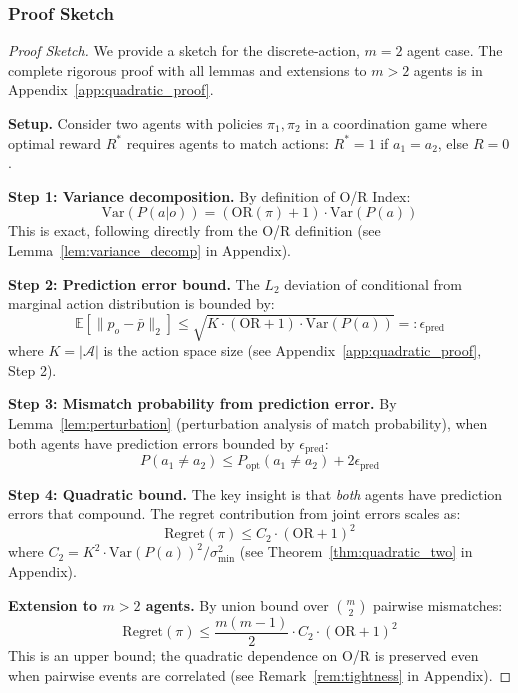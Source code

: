 \subsubsection{Proof Sketch}

\begin{proof}[Proof Sketch]
We provide a sketch for the discrete-action, $m=2$ agent case. The complete rigorous proof with all lemmas and extensions to $m > 2$ agents is in Appendix~\ref{app:quadratic_proof}.

\textbf{Setup.} Consider two agents with policies $\pi_1, \pi_2$ in a coordination game where optimal reward $R^*$ requires agents to match actions: $R^* = 1$ if $a_1 = a_2$, else $R = 0$.

\textbf{Step 1: Variance decomposition.}
By definition of O/R Index:
\begin{equation}
\text{Var}(P(a|o)) = (\text{OR}(\pi) + 1) \cdot \text{Var}(P(a))
\end{equation}
This is exact, following directly from the O/R definition (see Lemma~\ref{lem:variance_decomp} in Appendix).

\textbf{Step 2: Prediction error bound.}
The $L_2$ deviation of conditional from marginal action distribution is bounded by:
\begin{equation}
\mathbb{E}[\|p_o - \bar{p}\|_2] \leq \sqrt{K \cdot (\text{OR} + 1) \cdot \text{Var}(P(a))} =: \epsilon_{\text{pred}}
\end{equation}
where $K = |\mathcal{A}|$ is the action space size (see Appendix~\ref{app:quadratic_proof}, Step 2).

\textbf{Step 3: Mismatch probability from prediction error.}
By Lemma~\ref{lem:perturbation} (perturbation analysis of match probability), when both agents have prediction errors bounded by $\epsilon_{\text{pred}}$:
\begin{equation}
P(a_1 \neq a_2) \leq P_{\text{opt}}(a_1 \neq a_2) + 2\epsilon_{\text{pred}}
\end{equation}

\textbf{Step 4: Quadratic bound.}
The key insight is that \textit{both} agents have prediction errors that compound. The regret contribution from joint errors scales as:
\begin{equation}
\text{Regret}(\pi) \leq C_2 \cdot (\text{OR} + 1)^2
\end{equation}
where $C_2 = K^2 \cdot \text{Var}(P(a))^2 / \sigma^2_{\min}$ (see Theorem~\ref{thm:quadratic_two} in Appendix).

\textbf{Extension to $m > 2$ agents.} By union bound over $\binom{m}{2}$ pairwise mismatches:
\begin{equation}
\text{Regret}(\pi) \leq \frac{m(m-1)}{2} \cdot C_2 \cdot (\text{OR} + 1)^2
\end{equation}
This is an upper bound; the quadratic dependence on O/R is preserved even when pairwise events are correlated (see Remark~\ref{rem:tightness} in Appendix).
\end{proof}

